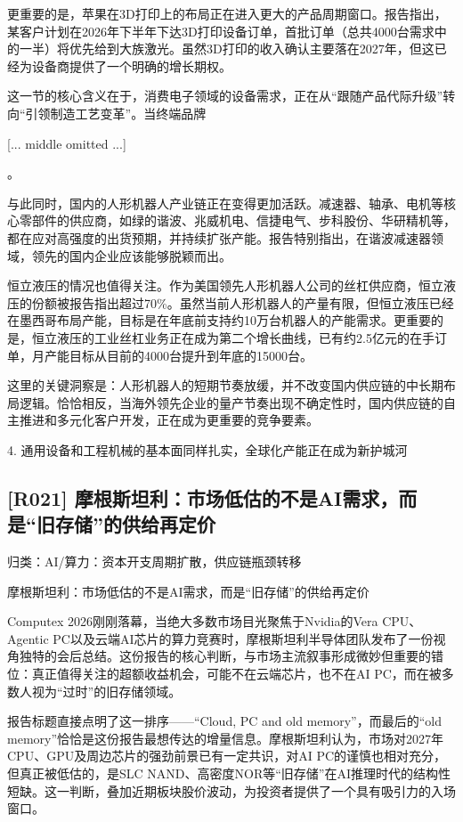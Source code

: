 \documentclass[11pt]{ctexart}
\begin{document}
更重要的是，苹果在3D打印上的布局正在进入更大的产品周期窗口。报告指出，某客户计划在2026年下半年下达3D打印设备订单，首批订单（总共4000台需求中的一半）将优先给到大族激光。虽然3D打印的收入确认主要落在2027年，但这已经为设备商提供了一个明确的增长期权。

这一节的核心含义在于，消费电子领域的设备需求，正在从“跟随产品代际升级”转向“引领制造工艺变革”。当终端品牌

[... middle omitted ...]

。

与此同时，国内的人形机器人产业链正在变得更加活跃。减速器、轴承、电机等核心零部件的供应商，如绿的谐波、兆威机电、信捷电气、步科股份、华研精机等，都在应对高强度的出货预期，并持续扩张产能。报告特别指出，在谐波减速器领域，领先的国内企业应该能够脱颖而出。

恒立液压的情况也值得关注。作为美国领先人形机器人公司的丝杠供应商，恒立液压的份额被报告指出超过70\%。虽然当前人形机器人的产量有限，但恒立液压已经在墨西哥布局产能，目标是在年底前支持约10万台机器人的产能需求。更重要的是，恒立液压的工业丝杠业务正在成为第二个增长曲线，已有约2.5亿元的在手订单，月产能目标从目前的4000台提升到年底的15000台。

这里的关键洞察是：人形机器人的短期节奏放缓，并不改变国内供应链的中长期布局逻辑。恰恰相反，当海外领先企业的量产节奏出现不确定性时，国内供应链的自主推进和多元化客户开发，正在成为更重要的竞争要素。

4. 通用设备和工程机械的基本面同样扎实，全球化产能正在成为新护城河

\subsection{[R021] 摩根斯坦利：市场低估的不是AI需求，而是“旧存储”的供给再定价}
{\small\color{refgray}归类：AI/算力：资本开支周期扩散，供应链瓶颈转移}

摩根斯坦利：市场低估的不是AI需求，而是“旧存储”的供给再定价

Computex 2026刚刚落幕，当绝大多数市场目光聚焦于Nvidia的Vera CPU、Agentic PC以及云端AI芯片的算力竞赛时，摩根斯坦利半导体团队发布了一份视角独特的会后总结。这份报告的核心判断，与市场主流叙事形成微妙但重要的错位：真正值得关注的超额收益机会，可能不在云端芯片，也不在AI PC，而在被多数人视为“过时”的旧存储领域。

报告标题直接点明了这一排序——“Cloud, PC and old memory”，而最后的“old memory”恰恰是这份报告最想传达的增量信息。摩根斯坦利认为，市场对2027年CPU、GPU及周边芯片的强劲前景已有一定共识，对AI PC的谨慎也相对充分，但真正被低估的，是SLC NAND、高密度NOR等“旧存储”在AI推理时代的结构性短缺。这一判断，叠加近期板块股价波动，为投资者提供了一个具有吸引力的入场窗口。
\end{document}
